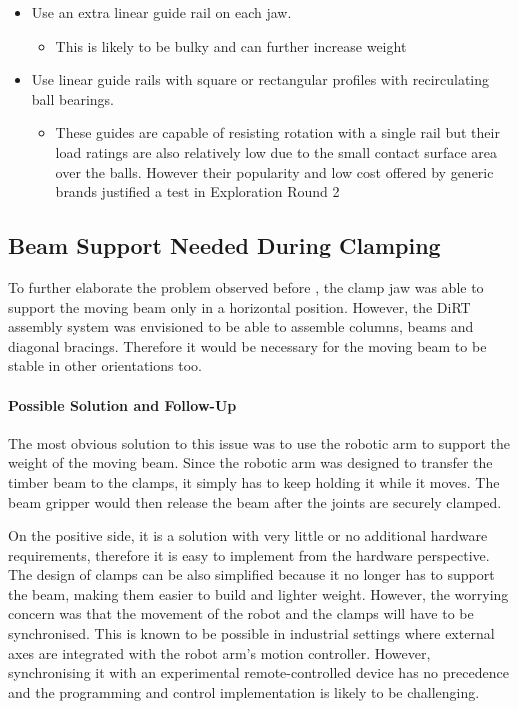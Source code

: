 \begin{itemize}[nosep]
    \item Use an extra linear guide rail on each jaw.
    \begin{itemize}
        \item This is likely to be bulky and can further increase weight
    \end{itemize}
    \item Use linear guide rails with square or rectangular profiles with recirculating ball bearings.
    \begin{itemize}
        \item These guides are capable of resisting rotation with a single rail but their load ratings are also relatively low due to the small contact surface area over the balls. However their popularity and low cost offered by generic brands justified a test in Exploration Round 2 
    \end{itemize}
\end{itemize}

\subsection{Beam Support Needed During Clamping}
\label{subsection:exploration-1-beam-support-needed-during-clamping}

To further elaborate the problem observed before , the clamp jaw was able to support the moving beam only in a horizontal position. However, the DiRT assembly system was envisioned to be able to assemble columns, beams and diagonal bracings. Therefore it would be necessary for the moving beam to be stable in other orientations too.

\paragraph{Possible Solution and Follow-Up}

The most obvious solution to this issue was to use the robotic arm to support the weight of the moving beam. Since the robotic arm was designed to transfer the timber beam to the clamps, it simply has to keep holding it while it moves. The beam gripper would then release the beam after the joints are securely clamped.

On the positive side, it is a solution with very little or no additional hardware requirements, therefore it is easy to implement from the hardware perspective. The design of clamps can be also simplified because it no longer has to support the beam, making them easier to build and lighter weight. However, the worrying concern was that the movement of the robot and the clamps will have to be synchronised. This is known to be possible in industrial settings where external axes are integrated with the robot arm’s motion controller. However, synchronising it with an experimental remote-controlled device has no precedence and the programming and control implementation is likely to be challenging.

